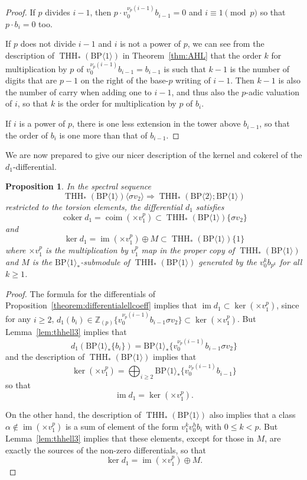 \documentclass[11pt]{amsart}
\newcommand{\mr}[1]{\mathrm{#1}}
\newcommand{\Z}{\mathbb{Z}}
\newcommand{\BP}{\mr{BP}}
\DeclareMathOperator{\im}{im}
\DeclareMathOperator{\THH}{THH}
\newtheorem{proposition}[equation]{Proposition}
\theoremstyle{definition}
\numberwithin{equation}{section}
\numberwithin{figure}{section}
\begin{document}
\begin{proof}
  If $p$ divides $i - 1$, then $p \cdot v_0^{\nu_p(i-1)} b_{i-1} = 0$ and $i \equiv 1 \pmod{p}$ so that $p \cdot b_i = 0$ too.

  If $p$ does not divide $i-1$ and $i$ is not a power of $p$, we can see from the description of $\THH_*(\BP\langle 1\rangle)$ in Theorem~\ref{thm:AHL} that the order $k$ for multiplication by $p$ of $v_0^{\nu_p(i-1)} b_{i-1} = b_{i -1}$ is such that $k -1$ is the number of digits that are $p - 1$ on the right of the base-$p$ writing of $i - 1$. Then $k-1$ is also the number of carry when adding one to $i -1$, and thus also the $p$-adic valuation of $i$, so that $k$ is the order for multiplication by $p$ of $b_i$.

  If $i$ is a power of $p$, there is one less extension in the tower above $b_{i-1}$, so that the order of $b_i$ is one more than that of $b_{i-1}$.
\end{proof}
We are now prepared to give our nicer description of the kernel and cokerel of the $d_1$-differential. 
\begin{proposition} \label{prop:specseqtorsion}
  In the spectral sequence
  \[
    \THH_*(\BP\langle 1\rangle) \langle \sigma v_2 \rangle \Rightarrow \THH_*(\BP \langle 2 \rangle; \BP\langle 1\rangle)
  \]
  restricted to the torsion elements, the differential $d_1$ satisfies
  \[
    \operatorname{coker} d_1 = \operatorname{coim}(\times v_1^p) \subset \THH_*(\BP\langle 1\rangle)\{ \sigma v_2 \}
  \]
  and
  \[
    \ker d_1 =  \im (\times v_1^p) \oplus M \subset \THH_*(\BP\langle 1\rangle)\{ 1 \}
  \]
  where $\times v_1^p$ is the multiplication by $v_1^p$ map in the proper copy of $\THH_*(\BP\langle 1\rangle)$ and $M$ is the $\BP\langle 1\rangle_*$-submodule of $\THH_*(\BP\langle 1\rangle)$ generated by the $v_0^{k}b_{p^k}$ for all $k \geq 1$.
\end{proposition}

\begin{proof}
  The formula for the differentials of Proposition~\ref{theorem:differentialellcoeff} implies that $\im d_1 \subset \ker (\times v_1^p)$, since for any $i \geq 2$, $d_1(b_i) \in \Z_{(p)}\{ v_0^{\nu_p(i-1)} b_{i-1} \sigma v_2 \} \subset \ker (\times v_1^p)$. But Lemma~\ref{lem:thhell3} implies that
  \[
    d_1(\BP\langle 1\rangle_*\{ b_i \} ) = \BP\langle 1\rangle_* \{ v_0^{\nu_p(i-1)} b_{i-1} \sigma v_2 \}
  \]
  and the description of $\THH_*(\BP\langle 1\rangle)$ implies that
  \[
    \ker (\times v_1^p) = \bigoplus_{i \geq 2} \BP\langle 1\rangle_* \{ v_0^{\nu_p(i-1)} b_{i-1} \}
  \]
  so that
  \[
    \im d_1 = \ker (\times v_1^p).
  \]

  On the other hand, the description of $\THH_*(\BP\langle 1\rangle)$ also implies that a class $\alpha \notin \im (\times v_1^p)$ is a sum of element of the form $v_1^k v_0^h b_i$ with $0 \leq k < p$. 
  But Lemma~\ref{lem:thhell3} implies that these elements, except for those in $M$, are exactly the sources of the non-zero differentials, so that
  \[
    \ker d_1 = \im (\times v_1^p) \oplus M.
  \]
\end{proof}
\end{document}
